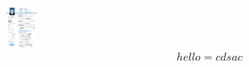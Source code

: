 \documentclass[a4paper]{article}
\begin{document}
\includegraphics[width = 1cm]{tt.pdf}
\[
	hello = cdsac
\]
\end{document}
